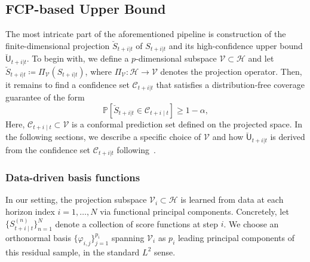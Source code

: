 \documentclass[lettersize,journal]{IEEEtran}
\begin{document}
\subsection{FCP-based Upper Bound}
The most intricate part of the aforementioned pipeline is construction of the finite-dimensional projection $\breve{S}_{t+i|t}$ of $S_{t+i|t}$ and its high-confidence upper bound $\breve{\mathsf{U}}_{t+i|t}$. To begin with, we define a $p$-dimensional subspace $\mathscr{V} \subset \mathscr{H}$ and let $\breve{S}_{t+i|t} \coloneqq \Pi_{\mathscr{V}}(S_{t+i|t})$, where $\Pi_{\mathscr{V}} : \mathscr{H} \to \mathscr{V}$ denotes the projection operator.
Then, it remains to find a confidence set $\mathscr{C}_{t+i|t}$ that satisfies a distribution-free coverage guarantee of the form
\begin{equation}
\mathbb{P}\left[
\breve{S}_{t+i|t} \in \mathscr{C}_{t+i\mid t}
\right] \ge 1 - \alpha,
\label{eq:functional_projected_coverage}
\end{equation}
Here, $\mathscr{C}_{t+i\mid t} \subset \mathscr{V}$ is a conformal prediction set
defined on the projected space.
In the following sections, we describe a specific choice of $\mathscr{V}$ and how $\breve{\mathsf{U}}_{t+i|t}$ is derived from the confidence set $\mathscr{C}_{t+i|t}$ following~\cite{lei2015conformal}.



\subsubsection{Data-driven basis functions}
In our setting, the projection subspace $\mathscr{V}_{i}\subset\mathscr{H}$
is learned from data at each horizon index $i=1, \ldots, N$ via functional principal components.
Concretely, let $\{S^{(n)}_{t+i\mid t}\}_{n=1}^N$ denote a collection of score functions
at step $i$.
We choose an orthonormal basis
$\{\varphi_{i,j}\}_{j=1}^{p_i}$ spanning $\mathscr{V}_{i}$ as $p_i$ leading principal components
of this residual sample, in the standard $L^2$ sense.
\end{document}
